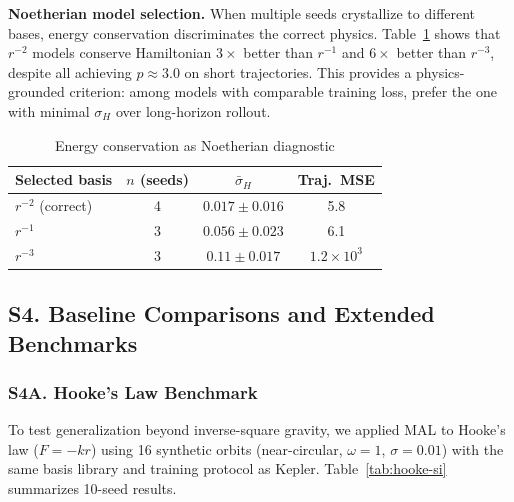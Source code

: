 \documentclass[9pt,twocolumn,twoside]{pnas-new}
\begin{document}
\textbf{Noetherian model selection.} When multiple seeds crystallize to different bases, energy conservation discriminates the correct physics. Table~\ref{tab:noether-si} shows that $r^{-2}$ models conserve Hamiltonian $3\times$ better than $r^{-1}$ and $6\times$ better than $r^{-3}$, despite all achieving $p \approx 3.0$ on short trajectories. This provides a physics-grounded criterion: among models with comparable training loss, prefer the one with minimal $\sigma_H$ over long-horizon rollout.

\begin{table}[!ht]
\centering
\caption{Energy conservation as Noetherian diagnostic}
\label{tab:noether-si}
\small
\begin{tabular}{lccc}
\hline
Selected basis & $n$ (seeds) & $\bar{\sigma}_H$ & Traj.\ MSE \\
\hline
$r^{-2}$ (correct) & 4 & $0.017 \pm 0.016$ & 5.8 \\
$r^{-1}$ & 3 & $0.056 \pm 0.023$ & 6.1 \\
$r^{-3}$ & 3 & $0.11 \pm 0.017$ & $1.2 \times 10^3$ \\
\hline
\end{tabular}
\end{table}

\subsection*{S4. Baseline Comparisons and Extended Benchmarks}

\subsubsection*{S4A. Hooke's Law Benchmark}
To test generalization beyond inverse-square gravity, we applied MAL to Hooke's law ($F = -kr$) using 16 synthetic orbits (near-circular, $\omega = 1$, $\sigma = 0.01$) with the same basis library and training protocol as Kepler. Table~\ref{tab:hooke-si} summarizes 10-seed results.
\end{document}
